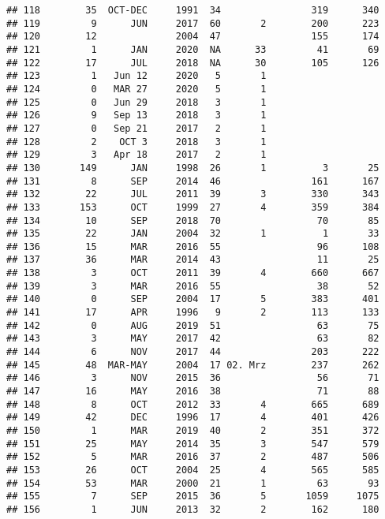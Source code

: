 \documentclass[
  english,
  man]{apa6}
\begin{document}
\begin{verbatim}
## 118        35  OCT-DEC     1991  34                319      340
## 119         9      JUN     2017  60       2        200      223
## 120        12              2004  47                155      174
## 121         1      JAN     2020  NA      33         41       69
## 122        17      JUL     2018  NA      30        105      126
## 123         1   Jun 12     2020   5       1                    
## 124         0   MAR 27     2020   5       1                    
## 125         0   Jun 29     2018   3       1                    
## 126         9   Sep 13     2018   3       1                    
## 127         0   Sep 21     2017   2       1                    
## 128         2    OCT 3     2018   3       1                    
## 129         3   Apr 18     2017   2       1                    
## 130       149      JAN     1998  26       1          3       25
## 131         8      SEP     2014  46                161      167
## 132        22      JUL     2011  39       3        330      343
## 133       153      OCT     1999  27       4        359      384
## 134        10      SEP     2018  70                 70       85
## 135        22      JAN     2004  32       1          1       33
## 136        15      MAR     2016  55                 96      108
## 137        36      MAR     2014  43                 11       25
## 138         3      OCT     2011  39       4        660      667
## 139         3      MAR     2016  55                 38       52
## 140         0      SEP     2004  17       5        383      401
## 141        17      APR     1996   9       2        113      133
## 142         0      AUG     2019  51                 63       75
## 143         3      MAY     2017  42                 63       82
## 144         6      NOV     2017  44                203      222
## 145        48  MAR-MAY     2004  17 02. Mrz        237      262
## 146         3      NOV     2015  36                 56       71
## 147        16      MAY     2016  38                 71       88
## 148         8      OCT     2012  33       4        665      689
## 149        42      DEC     1996  17       4        401      426
## 150         1      MAR     2019  40       2        351      372
## 151        25      MAY     2014  35       3        547      579
## 152         5      MAR     2016  37       2        487      506
## 153        26      OCT     2004  25       4        565      585
## 154        53      MAR     2000  21       1         63       93
## 155         7      SEP     2015  36       5       1059     1075
## 156         1      JUN     2013  32       2        162      180

\end{verbatim}
\end{document}
